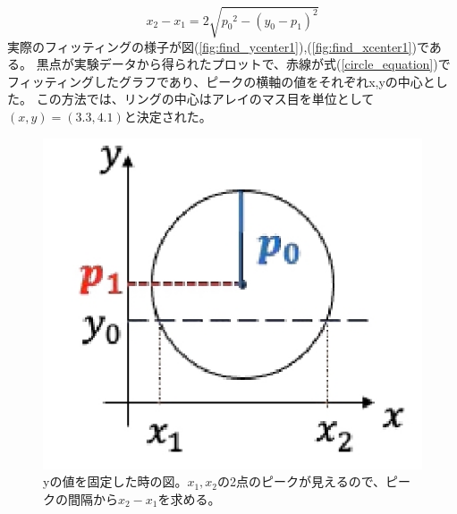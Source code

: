 \documentclass[uplatex, titlepage, dvipdfmx, 12pt, a4paper]{jsreport}
\begin{document}
      \begin{equation}
        x_2 - x_1 = 2\sqrt{{p_0}^2-{\left(y_0-p_1\right)}^2}
        \label{circle_equation}
      \end{equation}
      実際のフィッティングの様子が図(\ref{fig:find_ycenter1}),(\ref{fig:find_xcenter1})である。
      黒点が実験データから得られたプロットで、赤線が式(\ref{circle_equation})でフィッティングしたグラフであり、ピークの横軸の値をそれぞれx,yの中心とした。
      この方法では、リングの中心はアレイのマス目を単位として$\left(x,y\right)=\left(3.3, 4.1\right)$と決定された。
      \begin{figure}[hbtp]
        \begin{center}
          \includegraphics[scale=0.5, clip]{image/find_center1.jpg}
          \caption{yの値を固定した時の図。$x_1, x_2$の2点のピークが見えるので、ピークの間隔から$x_2-x_1$を求める。} 
          \label{fig:find_center_image} 
        \end{center}
      \end{figure}
\end{document}
